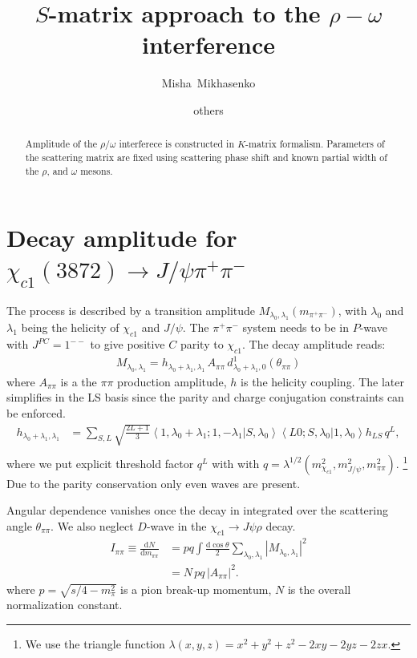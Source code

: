 \documentclass[aps,prd,superscriptaddress,onecolumn,nofootinbib,preprintnumbers,notitlepage]{revtex4-1}
\newcommand{\diff}{\mathrm{d}}
\newcommand{\chicO}{\ensuremath{\chi_{c1}}\xspace}
\begin{document}
\graphicspath{{../plots/}}

\title{$S$-matrix approach to the $\rho-\omega$ interference}
\author{Misha~Mikhasenko}
\author{others}

\begin{abstract}
  Amplitude of the $\rho/\omega$ interferece is constructed in $K$-matrix formalism.
Parameters of the scattering matrix are fixed using scattering phase shift and known partial width of the $\rho$,
  and $\omega$ mesons.
\end{abstract}

\nopagebreak
\maketitle

\section{Decay amplitude for $\chicO(3872)\to J/\psi \pi^+\pi^-$}
The process is described by a transition amplitude $M_{\lambda_0,\lambda_1}(m_{\pi^+\pi^-})$,
with $\lambda_0$ and $\lambda_1$ being the helicity of $\chicO$ and $J/\psi$.
The $\pi^+\pi^-$ system needs to be in $P$-wave with $J^{PC} = 1^{--}$ to give positive $C$ parity to $\chicO$.
The decay amplitude reads:
\begin{align}
  M_{\lambda_0,\lambda_1} = h_{\lambda_0+\lambda_1,\lambda_1} \,A_{\pi\pi}\,d_{\lambda_0+\lambda_1,0}^1(\theta_{\pi\pi})
\end{align}
where $A_{\pi\pi}$ is a the $\pi\pi$ production amplitude, $h$ is the helicity coupling.
The later simplifies in the LS basis since the parity and charge conjugation constraints can be enforced.
\begin{align}
  h_{\lambda_0+\lambda_1,\lambda_1} &= \sum_{S,L} \sqrt{\frac{2L+1}{3}}
    \left\langle 1,\lambda_0+\lambda_1;1,-\lambda_1 | S, \lambda_0\right\rangle
    \left\langle L 0;S, \lambda_0 | 1, \lambda_0\right\rangle h_{LS}\,q^L,\\
\end{align}
where we put explicit threshold factor $q^L$ with 
with $q = \lambda^{1/2}(m_{\chicO}^2,m_{J/\psi}^2,m_{\pi\pi}^2)$.
\footnote{We use the triangle function $\lambda(x,y,z) = x^2+y^2+z^2-2xy-2yz-2zx$.}
Due to the parity conservation only even waves are present.


Angular dependence vanishes once the decay in integrated
over the scattering angle $\theta_{\pi\pi}$. We also neglect $D$-wave in the $\chicO\to J\psi\rho$ decay.
\begin{align}
  I_{\pi\pi} \equiv \frac{\diff N}{\diff m_{\pi\pi}} &= p q \int \frac{\diff\cos\theta}{2} \sum_{\lambda_0,\lambda_1} | M_{\lambda_0,\lambda_1}|^2\\
  &= N\,p q \,|A_{\pi\pi}|^2.
\end{align}
where $p = \sqrt{s/4-m_\pi^2}$ is a pion break-up momentum,
$N$ is the overall normalization constant.
\end{document}
